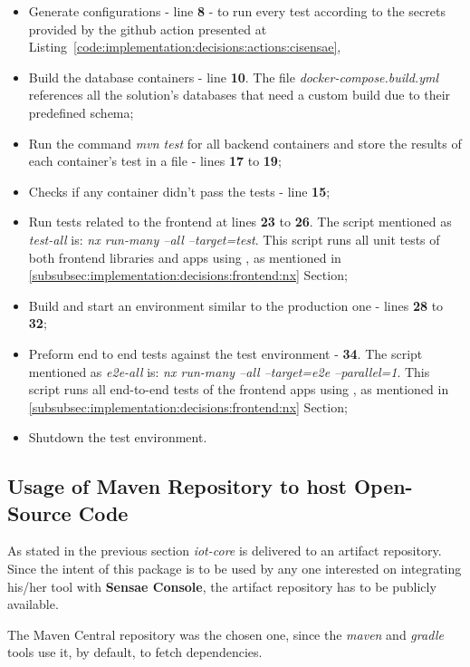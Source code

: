 \begin{itemize}
    \item Generate configurations - line \textbf{8} - to run every test according to the secrets provided by the github action presented at Listing~\ref{code:implementation:decisions:actions:cisensae},
    \item Build the database containers - line \textbf{10}. The file \textit{docker-compose.build.yml} references all the solution's databases that need a custom build due to their predefined schema;
    \item Run the command \textit{mvn test} for all backend containers and store the results of each container's test in a file - lines \textbf{17} to \textbf{19};
    \item Checks if any container didn't pass the tests - line \textbf{15};
    \item Run tests related to the frontend at lines \textbf{23} to \textbf{26}. The script mentioned as \textit{test-all} is: \textit{nx run-many --all --target=test}. This script runs all unit tests of both frontend libraries and apps using , as mentioned in \ref{subsubsec:implementation:decisions:frontend:nx} Section;
    \item Build and start an environment similar to the production one - lines \textbf{28} to \textbf{32};
    \item Preform end to end tests against the test environment - \textbf{34}. The script mentioned as \textit{e2e-all} is: \textit{nx run-many --all --target=e2e --parallel=1}. This script runs all end-to-end tests of the frontend apps using , as mentioned in \ref{subsubsec:implementation:decisions:frontend:nx} Section;
    \item Shutdown the test environment.
\end{itemize}

\subsection{Usage of Maven Repository to host Open-Source Code}
\label{subsec:implementation:decisions:maven}

As stated in the previous section \textit{iot-core} is delivered to an artifact repository. Since the intent of this package is to be used by any one interested on integrating his/her tool with \textbf{Sensae Console}, the artifact repository has to be publicly available. 

The Maven Central repository was the chosen one, since the \textit{maven} and \textit{gradle} tools use it, by default, to fetch dependencies.

